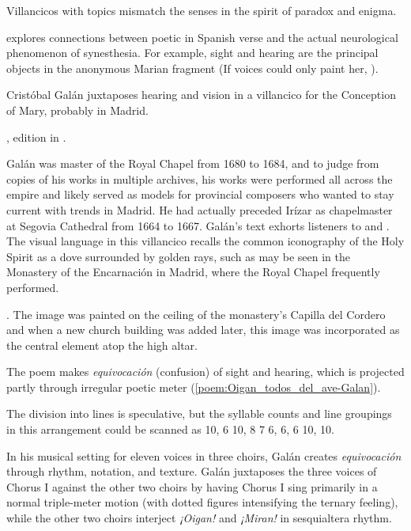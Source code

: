 Villancicos with  topics mismatch the senses in the spirit
of paradox and enigma.%
\begin{Footnote}
    \Autocite{DoetschKraus:Sinestesia} explores connections between poetic
     in Spanish verse and the actual
    neurological phenomenon of synesthesia.  
    For example, sight and hearing are the principal objects in the anonymous
    Marian fragment  (If voices
    could only paint her, ).
\end{Footnote}
Cristóbal Galán juxtaposes hearing and vision in a villancico for the Conception
of Mary, probably in Madrid.%
\begin{Footnote}
    , edition in \autocite[567--568]{CaberoPueyo:PhD}.
\end{Footnote}
Galán was master of the Royal Chapel from 1680 to 1684, and to judge from copies
of his works in multiple archives, his works were performed all across the
empire and likely served as models for provincial composers who wanted to stay
current with trends in Madrid.
He had actually preceded Irízar as chapelmaster at Segovia Cathedral from 1664
to 1667.%
    \Autocite{Baron-Sage:GalanC}
Galán's text exhorts listeners to  and .
The visual language in this villancico recalls the common iconography of the
Holy Spirit as a dove surrounded by golden rays, such as may be seen in the
Monastery of the Encarnación in Madrid, where the Royal Chapel frequently
performed.%
\begin{Footnote}
    \Autocite[69--70, 81]{Sanz:GuiaDescalzasEncarnacion}.
    The image was painted on the ceiling of the monastery's Capilla del Cordero
    and when a new church building was added later, this image was incorporated
    as the central element atop the high altar.
\end{Footnote}
The poem makes \emph{equivocación} (confusion) of sight and hearing, which is
projected partly through irregular poetic meter
(\cref{poem:Oigan_todos_del_ave-Galan}).%
\begin{Footnote}
    The division into lines is speculative, but the syllable counts and line
    groupings in this arrangement could be scanned as  10, 6 10, 8 7 6, 6, 6 10,
    10.
\end{Footnote}
In his musical setting for eleven voices in three choirs, Galán creates
\emph{equivocación} through rhythm, notation, and texture.  
Galán juxtaposes the three voices of Chorus I against the other two choirs by
having Chorus I sing primarily in a normal triple-meter motion (with dotted
figures intensifying the ternary feeling), while the other two choirs interject
\emph{¡Oigan!} and \emph{¡Miran!} in sesquialtera rhythm.

